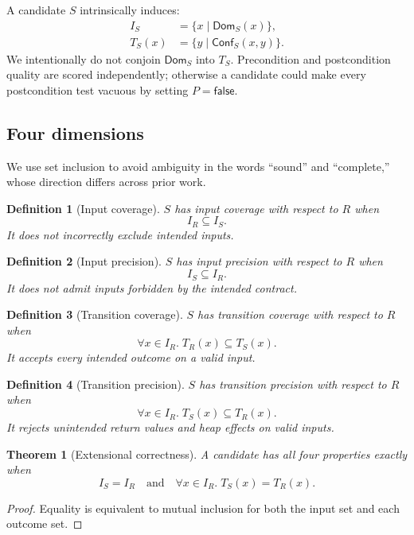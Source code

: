 \documentclass[10pt]{article}
\newtheorem{definition}{Definition}
\newtheorem{theorem}{Theorem}
\newcommand{\false}{\mathsf{false}}
\begin{document}
A candidate $S$ intrinsically induces:
\[
\begin{split}
I_S
  &=\{x\mid \mathsf{Dom}_S(x)\},\\
T_S(x)
  &=\{y\mid\mathsf{Conf}_S(x,y)\}.
\end{split}
\]
We intentionally do not conjoin $\mathsf{Dom}_S$ into $T_S$.  Precondition and
postcondition quality are scored independently; otherwise a candidate could
make every postcondition test vacuous by setting $P=\false$.

\subsection{Four dimensions}

We use set inclusion to avoid ambiguity in the words ``sound'' and
``complete,'' whose direction differs across prior work.

\begin{definition}[Input coverage]
$S$ has input coverage with respect to $R$ when
\[
  I_R\subseteq I_S.
\]
It does not incorrectly exclude intended inputs.
\end{definition}

\begin{definition}[Input precision]
$S$ has input precision with respect to $R$ when
\[
  I_S\subseteq I_R.
\]
It does not admit inputs forbidden by the intended contract.
\end{definition}

\begin{definition}[Transition coverage]
$S$ has transition coverage with respect to $R$ when
\[
  \forall x\in I_R.\;T_R(x)\subseteq T_S(x).
\]
It accepts every intended outcome on a valid input.
\end{definition}

\begin{definition}[Transition precision]
$S$ has transition precision with respect to $R$ when
\[
  \forall x\in I_R.\;T_S(x)\subseteq T_R(x).
\]
It rejects unintended return values and heap effects on valid inputs.
\end{definition}

\begin{theorem}[Extensional correctness]
A candidate has all four properties exactly when
\[
I_S=I_R
\quad\text{and}\quad
\forall x\in I_R.\;T_S(x)=T_R(x).
\]
\end{theorem}
\begin{proof}
Equality is equivalent to mutual inclusion for both the input set and each
outcome set.
\end{proof}
\end{document}
